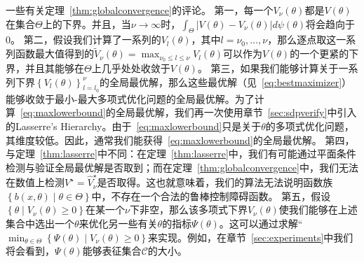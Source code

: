 一些有关定理~\ref{thm:globalconvergence}的评论。
第一，每一个$V_\nu(\theta)$都是$V(\theta)$在集合$\Theta$上的下界。并且，当$\nu \rightarrow \infty$时，$\int_\Theta |V(\theta) - V_\nu(\theta)| d\psi(\theta)$将会趋向于0。
第二，假设我们计算了一系列的$V_l(\theta)$，其中$l = \nu_0, \dots, \nu$，那么逐点取这一系列函数最大值得到的$\tilde{V}_\nu(\theta) = \max_{\nu_0 \le l \le \nu}V_l(\theta)$可以作为$V(\theta)$的一个更紧的下界，并且其能够在$\Theta$上几乎处处收敛于$V(\theta)$。
第三，如果我们能够计算关于一系列下界$\left\{ V_l(\theta) \right\}_{l=l_0}^\nu$的全局最优解，那么这些最优解（见~\eqref{eq:bestmaximizer}）能够收敛于最小-最大多项式优化问题的全局最优解。为了计算~\eqref{eq:maxlowerbound}的全局最优解，我们再一次使用章节~\ref{sec:sdpverify}中引入的Lasserre's Hierarchy。由于~\eqref{eq:maxlowerbound}只是关于$\theta$的多项式优化问题，其维度较低。因此，通常我们能获得~\eqref{eq:maxlowerbound}的全局最优解。
第四，与定理~\ref{thm:lasserre}中不同：在定理~\ref{thm:lasserre}中，我们有可能通过平面条件检测与验证全局最优解是否取到；而在定理~\ref{thm:globalconvergence}中，我们无法在数值上检测$V^\star = \hat{V}_\nu^\star$是否取得。这也就意味着，我们的算法无法说明函数族$\left\{ b(x, \theta) \mid \theta \in \Theta \right\}$中，不存在一个合法的鲁棒控制障碍函数。
第五，假设$\left\{ \theta \mid V_\nu(\theta) \ge 0 \right\}$在某一个$\nu$下非空，那么该多项式下界$V_\nu(\theta)$使我们能够在上述集合中选出一个$\theta$来优化另一些有关$\theta$的指标$\Psi(\theta)$。这可以通过求解“$\min_{\theta \in \Theta} \left\{ \Psi(\theta) \mid V_\nu(\theta) \ge 0 \right\}$来实现。例如，在章节~\ref{sec:experiments}中我们将会看到，$\Psi(\theta)$能够表征集合$\mathcal{C}$的大小。